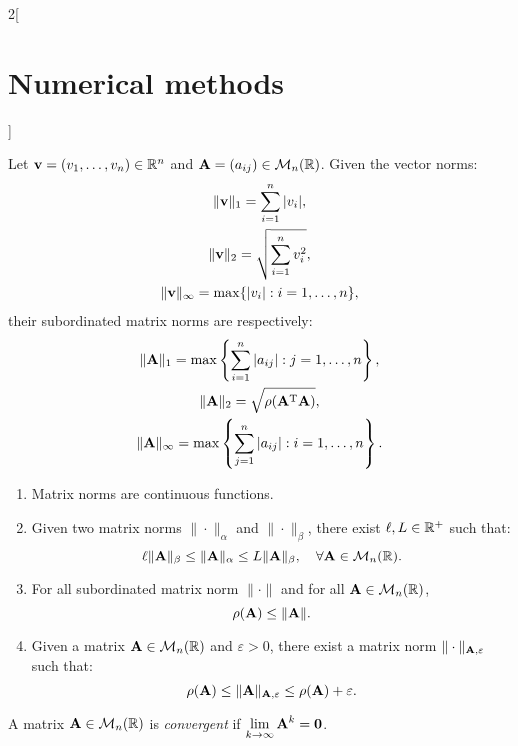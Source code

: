 \documentclass[../../../main.tex]{subfiles}
\begin{document}
\begin{multicols}{2}[\section{Numerical methods}]
\begin{definition}
\end{definition}
\begin{prop}
    Let $\vb{v}=(v_1,\ldots,v_n)\in\mathbb{R}^n$ and $\vb{A}=(a_{ij})\in\mathcal{M}_n(\mathbb{R})$. Given the vector norms: 
    \begin{gather*}
        \|\vb{v}\|_1=\sum_{i=1}^n|v_i|,\\
        \|\vb{v}\|_2=\sqrt{\sum_{i=1}^nv_i^2},\\
        \|\vb{v}\|_\infty=\max\{|v_i|:i=1,\ldots,n\},
    \end{gather*}
    their subordinated matrix norms are respectively:
    \begin{gather*}
        \|\vb{A}\|_1=\max\left\{\sum_{i=1}^n|a_{ij}|:j=1,\ldots,n\right\},\\
        \|\vb{A}\|_2=\sqrt{\rho(\vb{A}^{\mathrm{T}}\vb{A})},\\
        \|\vb{A}\|_\infty=\max\left\{\sum_{j=1}^n|a_{ij}|:i=1,\ldots,n\right\}.
    \end{gather*}
\end{prop}
\begin{prop}
    \hfill
    \begin{enumerate}
        \item Matrix norms are continuous functions.
        \item Given two matrix norms $\|\cdot\|_\alpha$ and $\|\cdot\|_\beta$, there exist $\ell, L\in\mathbb{R}^+$ such that: $$\ell \|\vb{A}\|_\beta\leq\|\vb{A}\|_\alpha\leq L\|\vb{A}\|_\beta,\quad\forall\vb{A}\in\mathcal{M}_n(\mathbb{R}).$$
        \item For all subordinated matrix norm $\|\cdot\|$ and for all $\vb{A}\in\mathcal{M}_n(\mathbb{R})$, $$\rho(\vb{A})\leq\|\vb{A}\|.$$
        \item Given a matrix $\vb{A}\in\mathcal{M}_n(\mathbb{R})$ and $\varepsilon>0$, there exist a matrix norm $\|\cdot\|_{\vb{A},\varepsilon}$ such that: $$\rho(\vb{A})\leq\|\vb{A}\|_{\vb{A},\varepsilon}\leq\rho(\vb{A})+\varepsilon.$$
    \end{enumerate}
\end{prop}
\begin{definition}
    A matrix $\vb{A}\in\mathcal{M}_n(\mathbb{R})$ is \textit{convergent} if $\displaystyle\lim_{k\to\infty}\vb{A}^k=\vb{0}$.  
\end{definition}
\begin{theorem}

\end{theorem}
\end{multicols}
\end{document}
